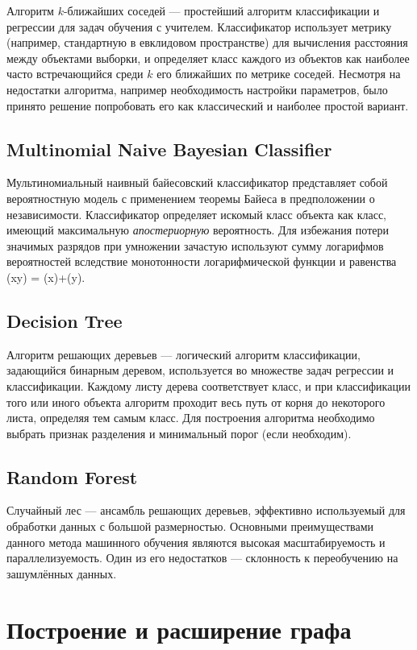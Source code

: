 \documentclass[14pt]{matmex-diploma-custom}
\begin{document}
Алгоритм $k$-ближайших соседей --- простейший алгоритм классификации и регрессии для задач обучения с учителем. Классификатор использует метрику (например, стандартную в евклидовом пространстве) для вычисления расстояния между объектами выборки, и определяет класс каждого из объектов как наиболее часто встречающийся среди $k$ его ближайших по метрике соседей. Несмотря на недостатки алгоритма, например необходимость настройки параметров, было принято решение попробовать его как классический и наиболее простой вариант.

\subsection*{Multinomial Naive Bayesian Classifier}
Мультиномиальный наивный байесовский классификатор представляет собой вероятностную модель с применением теоремы Байеса в предположении о независимости. Классификатор определяет искомый класс объекта как класс, имеющий максимальную \textit{апостериорную} вероятность. Для избежания потери значимых разрядов при умножении зачастую используют сумму логарифмов вероятностей вследствие монотонности логарифмической функции и равенства \log(x\cdot y) = \log(x)+\log(y).

\subsection*{Decision Tree}
Алгоритм решающих деревьев --- логический алгоритм классификации, задающийся бинарным деревом, используется во множестве задач регрессии и классификации. Каждому листу дерева соответствует класс, и при классификации того или иного объекта алгоритм проходит весь путь от корня до некоторого листа, определяя тем самым класс. Для построения алгоритма необходимо выбрать признак разделения и минимальный порог (если необходим). 

\subsection*{Random Forest}
Случайный лес --- ансамбль решающих деревьев, эффективно используемый для обработки данных с большой размерностью. Основными преимуществами данного метода машинного обучения являются высокая масштабируемость и параллелизуемость. Один из его недостатков --- склонность к переобучению на зашумлённых данных.

\section{Построение и расширение графа}
\end{document}
